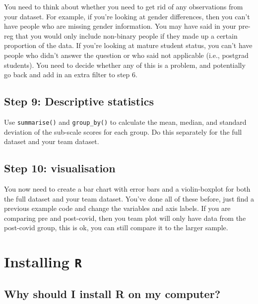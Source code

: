 \documentclass[
  oneside]{book}
\begin{document}
You need to think about whether you need to get rid of any observations from your dataset. For example, if you're looking at gender differences, then you can't have people who are missing gender information. You may have said in your pre-reg that you would only include non-binary people if they made up a certain proportion of the data. If you're looking at mature student status, you can't have people who didn't answer the question or who said not applicable (i.e., postgrad students). You need to decide whether any of this is a problem, and potentially go back and add in an extra filter to step 6.

\hypertarget{step-9-descriptive-statistics}{%
\section{Step 9: Descriptive statistics}\label{step-9-descriptive-statistics}}

Use \texttt{summarise()} and \texttt{group\_by()} to calculate the mean, median, and standard deviation of the sub-scale scores for each group. Do this separately for the full dataset and your team dataset.

\hypertarget{step-10-visualisation}{%
\section{Step 10: visualisation}\label{step-10-visualisation}}

You now need to create a bar chart with error bars and a violin-boxplot for both the full dataset and your team dataset. You've done all of these before, just find a previous example code and change the variables and axis labels. If you are comparing pre and post-covid, then you team plot will only have data from the post-covid group, this is ok, you can still compare it to the larger sample.

\hypertarget{appendix-appendices}{%
\appendix}


\hypertarget{installing-r}{%
\chapter{\texorpdfstring{Installing \texttt{R}}{Installing R}}\label{installing-r}}

\hypertarget{why-should-i-install-r-on-my-computer}{%
\section{Why should I install R on my computer?}\label{why-should-i-install-r-on-my-computer}}
\end{document}
